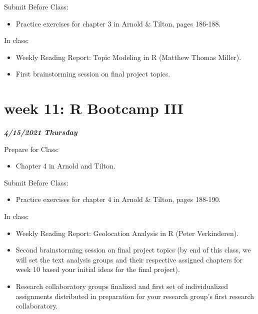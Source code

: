 \documentclass[
]{book}
\providecommand{\tightlist}{%
  \setlength{\itemsep}{0pt}\setlength{\parskip}{0pt}}
\begin{document}
Submit Before Class:

\begin{itemize}
\tightlist
\item
  Practice exercises for chapter 3 in Arnold \& Tilton, pages 186-188.
\end{itemize}

In class:

\begin{itemize}
\tightlist
\item
  Weekly Reading Report: Topic Modeling in R (Matthew Thomas Miller).
\item
  First brainstorming session on final project topics.
\end{itemize}

\hypertarget{week-11-r-bootcamp-iii-1}{%
\chapter{week 11: R Bootcamp III}\label{week-11-r-bootcamp-iii-1}}

\textbf{\emph{4/15/2021 Thursday}}

Prepare for Class:

\begin{itemize}
\tightlist
\item
  Chapter 4 in Arnold and Tilton.
\end{itemize}

Submit Before Class:

\begin{itemize}
\tightlist
\item
  Practice exercises for chapter 4 in Arnold \& Tilton, pages 188-190.
\end{itemize}

In class:

\begin{itemize}
\tightlist
\item
  Weekly Reading Report: Geolocation Analysis in R (Peter Verkinderen).
\item
  Second brainstorming session on final project topics (by end of this class, we will set the text analysis groups and their respective assigned chapters for week 10 based your initial ideas for the final project).
\item
  Research collaboratory groups finalized and first set of individualized assignments distributed in preparation for your research group's first research collaboratory.
\end{itemize}
\end{document}
